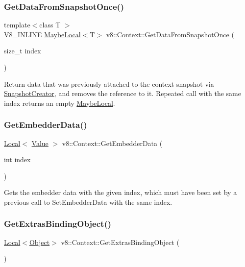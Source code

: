 \subsubsection{\texorpdfstring{Get\+Data\+From\+Snapshot\+Once()}{GetDataFromSnapshotOnce()}}
{\footnotesize\ttfamily template$<$class T $>$ \\
V8\+\_\+\+I\+N\+L\+I\+NE \mbox{\hyperlink{classv8_1_1MaybeLocal}{Maybe\+Local}}$<$T$>$ v8\+::\+Context\+::\+Get\+Data\+From\+Snapshot\+Once (\begin{DoxyParamCaption}\item[{size\+\_\+t}]{index }\end{DoxyParamCaption})}

Return data that was previously attached to the context snapshot via \mbox{\hyperlink{classv8_1_1SnapshotCreator}{Snapshot\+Creator}}, and removes the reference to it. Repeated call with the same index returns an empty \mbox{\hyperlink{classv8_1_1MaybeLocal}{Maybe\+Local}}. \mbox{\label{classv8_1_1Context_a9cfafe0ac56f6aee17eb80a913489296}} 
\subsubsection{\texorpdfstring{Get\+Embedder\+Data()}{GetEmbedderData()}}
{\footnotesize\ttfamily \mbox{\hyperlink{classv8_1_1Local}{Local}}$<$ \mbox{\hyperlink{classv8_1_1Value}{Value}} $>$ v8\+::\+Context\+::\+Get\+Embedder\+Data (\begin{DoxyParamCaption}\item[{int}]{index }\end{DoxyParamCaption})}

Gets the embedder data with the given index, which must have been set by a previous call to Set\+Embedder\+Data with the same index. \mbox{\label{classv8_1_1Context_aa06026c0a9dc43874b437675b8fd0059}} 
\subsubsection{\texorpdfstring{Get\+Extras\+Binding\+Object()}{GetExtrasBindingObject()}}
{\footnotesize\ttfamily \mbox{\hyperlink{classv8_1_1Local}{Local}}$<$\mbox{\hyperlink{classv8_1_1Object}{Object}}$>$ v8\+::\+Context\+::\+Get\+Extras\+Binding\+Object (\begin{DoxyParamCaption}{ }\end{DoxyParamCaption})}

